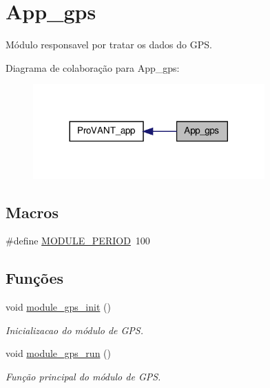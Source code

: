 \hypertarget{group__app__gps}{\section{App\-\_\-gps}
\label{group__app__gps}
}


Módulo responsavel por tratar os dados do G\-P\-S.  


Diagrama de colaboração para App\-\_\-gps\-:
\nopagebreak
\begin{figure}[H]
\begin{center}
\leavevmode
\includegraphics[width=252pt]{group__app__gps}
\end{center}
\end{figure}
\subsection*{Macros}
\begin{DoxyCompactItemize}
\item 
\#define \hyperlink{group__app__gps_ga0ac6c9f2991b096e49c354e5cce6fae0}{M\-O\-D\-U\-L\-E\-\_\-\-P\-E\-R\-I\-O\-D}~100
\end{DoxyCompactItemize}
\subsection*{Funções}
\begin{DoxyCompactItemize}
\item 
void \hyperlink{group__app__gps_ga9ee93102a0a5aec6877376bbcaf1dcb0}{module\-\_\-gps\-\_\-init} ()
\begin{DoxyCompactList}\small\item\em Inicializacao do módulo de G\-P\-S. \end{DoxyCompactList}\item 
void \hyperlink{group__app__gps_gace423457cfae0d22bd57db9e2fb4c033}{module\-\_\-gps\-\_\-run} ()
\begin{DoxyCompactList}\small\item\em Função principal do módulo de G\-P\-S. \end{DoxyCompactList}\end{DoxyCompactItemize}
